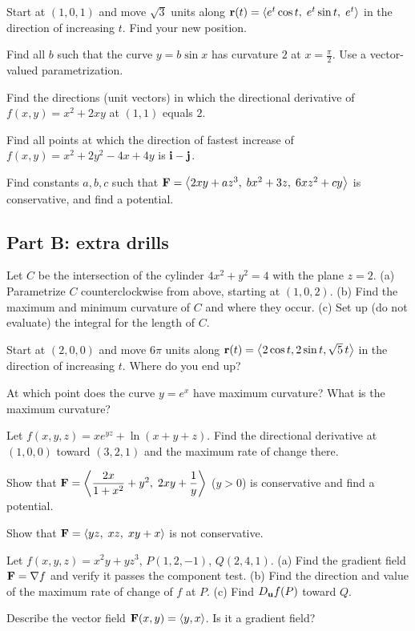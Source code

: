 \begin{questions}[resume]
\item Start at $(1,0,1)$ and move $\sqrt3$ units along
      $\mathbf{r}(t)=\left\langle e^t\cos t,\;e^t\sin t,\;e^t \right\rangle$ in the direction of increasing $t$.
      Find your new position.\label{pp:arc}
\item Find all $b$ such that the curve $y=b\sin x$ has curvature $2$ at $x=\frac\pi2$.
      Use a vector-valued parametrization.\label{pq:5}
\item Find the directions (unit vectors) in which the directional derivative of
      $f(x,y)=x^2+2xy$ at $(1,1)$ equals $2$.\label{pq:6}
\item Find all points at which the direction of fastest increase of
      $f(x,y)=x^2+2y^2-4x+4y$ is $\mathbf{i}-\mathbf{j}$.\label{pq:7}
\item Find constants $a,b,c$ such that
      $\mathbf{F}=\left\langle 2xy+az^3,\;bx^2+3z,\;6xz^2+cy \right\rangle$ is conservative, and find a potential.\label{pq:8}
\end{questions}

\subsection{Part B: extra drills}

\begin{questions}[resume]
\item Let $C$ be the intersection of the cylinder $4x^2+y^2=4$ with the plane $z=2$.
      (a) Parametrize $C$ counterclockwise from above, starting at $(1,0,2)$.
      (b) Find the maximum and minimum curvature of $C$ and where they occur.
      (c) Set up (do not evaluate) the integral for the length of $C$.\label{pd:1}
\item Start at $(2,0,0)$ and move $6\pi$ units along $\mathbf{r}(t)=\left\langle 2\cos t,2\sin t,\sqrt5\,t \right\rangle$
      in the direction of increasing $t$. Where do you end up?\label{pd:2}
\item At which point does the curve $y=e^x$ have maximum curvature? What is the
      maximum curvature?\label{pd:3}
\item Let $f(x,y,z)=xe^{yz}+\ln(x+y+z)$. Find the directional derivative at $(1,0,0)$
      toward $(3,2,1)$ and the maximum rate of change there.\label{pd:4}
\item Show that $\mathbf{F}=\left\langle \dfrac{2x}{1+x^2}+y^2,\;2xy+\dfrac1y \right\rangle$ ($y>0$) is conservative and find a potential.\label{pd:5}
\item Show that $\mathbf{F}=\left\langle yz,\;xz,\;xy+x \right\rangle$ is not conservative.\label{pd:6}
\item Let $f(x,y,z)=x^2y+yz^3$, $P(1,2,-1)$, $Q(2,4,1)$. (a) Find the gradient field
      $\mathbf{F}=\nabla f$ and verify it passes the component test. (b) Find the direction and
      value of the maximum rate of change of $f$ at $P$. (c) Find $D_{\mathbf{u}} f(P)$ toward $Q$.\label{pd:7}
\item Describe the vector field $\mathbf{F}(x,y)=\left\langle y,x \right\rangle$. Is it a gradient field?\label{pd:8}
\end{questions}
